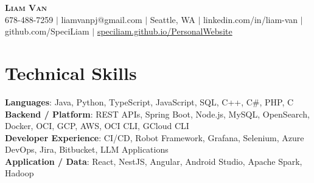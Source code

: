 \documentclass[letterpaper,11pt]{article}
\begin{document}

%
\begin{center}
    \textbf{\Huge \scshape Liam Van} \\ \vspace{1pt}
    \small 678-488-7259 $|$ \small {liamvanpj@gmail.com} $|$ Seattle, WA
 {{$|$ linkedin.com/in/liam-van} {$|$ github.com/SpeciLiam} {$|$ \href{https://speciliam.github.io/PersonalWebsite}{speciliam.github.io/PersonalWebsite}}}

\end{center}

\section{Technical Skills}
 \begin{itemize}[leftmargin=0.15in, label={}]
    \small{\item{
     \textbf{Languages}{: Java, Python, TypeScript, JavaScript, SQL, C++, C\#, PHP, C} \\
     \textbf{Backend / Platform}{: REST APIs, Spring Boot, Node.js, MySQL, OpenSearch, Docker, OCI, GCP, AWS, OCI CLI, GCloud CLI} \\
     \textbf{Developer Experience}{: CI/CD, Robot Framework, Grafana, Selenium, Azure DevOps, Jira, Bitbucket, LLM Applications} \\
     \textbf{Application / Data}{: React, NestJS, Angular, Android Studio, Apache Spark, Hadoop} \\
    }}
 \end{itemize}
%
\end{document}

